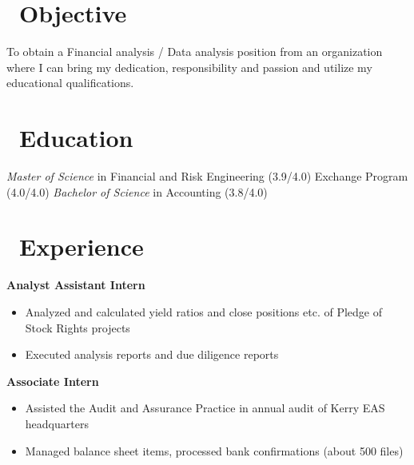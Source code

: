 \documentclass{resume}
\begin{document}



\section{\faUser\ Objective}
To obtain a Financial analysis / Data analysis position from an organization where I can bring my dedication, responsibility and passion and utilize my educational qualifications.
 
\section{\faGraduationCap\ Education}
\textit{Master of Science} in Financial and Risk Engineering (3.9/4.0)
Exchange Program (4.0/4.0) 
\textit{Bachelor of Science} in Accounting (3.8/4.0)

\section{\faUsers\ Experience}
\textbf{Analyst Assistant Intern}
\begin{itemize}
  \item Analyzed and calculated yield ratios and close positions etc. of Pledge of Stock Rights projects
  \item Executed analysis reports and due diligence reports
\end{itemize}

\textbf{Associate Intern}
\begin{itemize}
  \item Assisted the Audit and Assurance Practice in annual audit of Kerry EAS headquarters 
  \item Managed balance sheet items, processed bank confirmations (about 500 files)
\end{itemize}
\end{document}
